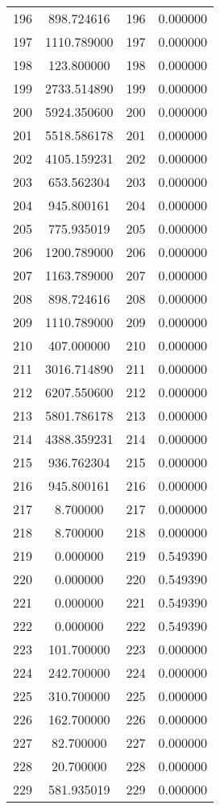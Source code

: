 \documentclass[12pt]{article}
\begin{document}
\begin{longtable}{@{}cccc@{}}
196 & 898.724616 & 196 & 0.000000 \\
197 & 1110.789000 & 197 & 0.000000 \\
198 & 123.800000 & 198 & 0.000000 \\
199 & 2733.514890 & 199 & 0.000000 \\
200 & 5924.350600 & 200 & 0.000000 \\
201 & 5518.586178 & 201 & 0.000000 \\
202 & 4105.159231 & 202 & 0.000000 \\
203 & 653.562304 & 203 & 0.000000 \\
204 & 945.800161 & 204 & 0.000000 \\
205 & 775.935019 & 205 & 0.000000 \\
206 & 1200.789000 & 206 & 0.000000 \\
207 & 1163.789000 & 207 & 0.000000 \\
208 & 898.724616 & 208 & 0.000000 \\
209 & 1110.789000 & 209 & 0.000000 \\
210 & 407.000000 & 210 & 0.000000 \\
211 & 3016.714890 & 211 & 0.000000 \\
212 & 6207.550600 & 212 & 0.000000 \\
213 & 5801.786178 & 213 & 0.000000 \\
214 & 4388.359231 & 214 & 0.000000 \\
215 & 936.762304 & 215 & 0.000000 \\
216 & 945.800161 & 216 & 0.000000 \\
217 & 8.700000 & 217 & 0.000000 \\
218 & 8.700000 & 218 & 0.000000 \\
219 & 0.000000 & 219 & 0.549390 \\
220 & 0.000000 & 220 & 0.549390 \\
221 & 0.000000 & 221 & 0.549390 \\
222 & 0.000000 & 222 & 0.549390 \\
223 & 101.700000 & 223 & 0.000000 \\
224 & 242.700000 & 224 & 0.000000 \\
225 & 310.700000 & 225 & 0.000000 \\
226 & 162.700000 & 226 & 0.000000 \\
227 & 82.700000 & 227 & 0.000000 \\
228 & 20.700000 & 228 & 0.000000 \\
229 & 581.935019 & 229 & 0.000000 \\

\end{longtable}
\end{document}
